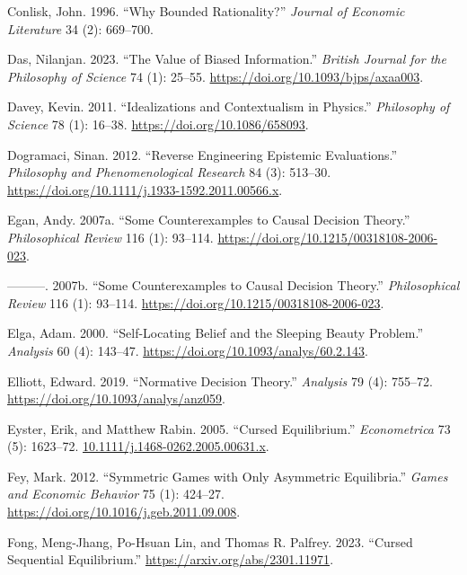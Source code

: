 \documentclass[
  12pt,
  letterpaper,
  DIV=11,
  numbers=noendperiod]{scrreprt}
\newlength{\cslhangindent}
\newenvironment{CSLReferences}[2] %
 {\begin{list}{}{%
  \setlength{\itemindent}{0pt}
  \setlength{\leftmargin}{0pt}
  \setlength{\parsep}{0pt}
  \ifodd #1
   \setlength{\leftmargin}{\cslhangindent}
   \setlength{\itemindent}{-1\cslhangindent}
  \fi
  \setlength{\itemsep}{#2\baselineskip}}}
 {\end{list}}
\begin{document}
\begin{CSLReferences}{1}{0}
Conlisk, John. 1996. {``Why Bounded Rationality?''} \emph{Journal of
Economic Literature} 34 (2): 669--700.

Das, Nilanjan. 2023. {``The Value of Biased Information.''}
\emph{British Journal for the Philosophy of Science} 74 (1): 25--55.
\url{https://doi.org/10.1093/bjps/axaa003}.

Davey, Kevin. 2011. {``Idealizations and Contextualism in Physics.''}
\emph{Philosophy of Science} 78 (1): 16--38.
\url{https://doi.org/10.1086/658093}.

Dogramaci, Sinan. 2012. {``Reverse Engineering Epistemic Evaluations.''}
\emph{Philosophy and Phenomenological Research} 84 (3): 513--30.
\url{https://doi.org/10.1111/j.1933-1592.2011.00566.x}.

Egan, Andy. 2007a. {``Some Counterexamples to Causal Decision Theory.''}
\emph{Philosophical Review} 116 (1): 93--114.
\url{https://doi.org/10.1215/00318108-2006-023}.

---------. 2007b. {``{Some Counterexamples to Causal Decision
Theory}.''} \emph{Philosophical Review} 116 (1): 93--114.
\url{https://doi.org/10.1215/00318108-2006-023}.

Elga, Adam. 2000. {``Self-Locating Belief and the Sleeping Beauty
Problem.''} \emph{Analysis} 60 (4): 143--47.
\url{https://doi.org/10.1093/analys/60.2.143}.

Elliott, Edward. 2019. {``Normative Decision Theory.''} \emph{Analysis}
79 (4): 755--72. \url{https://doi.org/10.1093/analys/anz059}.

Eyster, Erik, and Matthew Rabin. 2005. {``Cursed Equilibrium.''}
\emph{Econometrica} 73 (5): 1623--72.
\href{https://10.1111/j.1468-0262.2005.00631.x}{10.1111/j.1468-0262.2005.00631.x}.

Fey, Mark. 2012. {``Symmetric Games with Only Asymmetric Equilibria.''}
\emph{Games and Economic Behavior} 75 (1): 424--27.
\url{https://doi.org/10.1016/j.geb.2011.09.008}.

Fong, Meng-Jhang, Po-Hsuan Lin, and Thomas R. Palfrey. 2023. {``Cursed
Sequential Equilibrium.''} \url{https://arxiv.org/abs/2301.11971}.


\end{CSLReferences}
\end{document}
